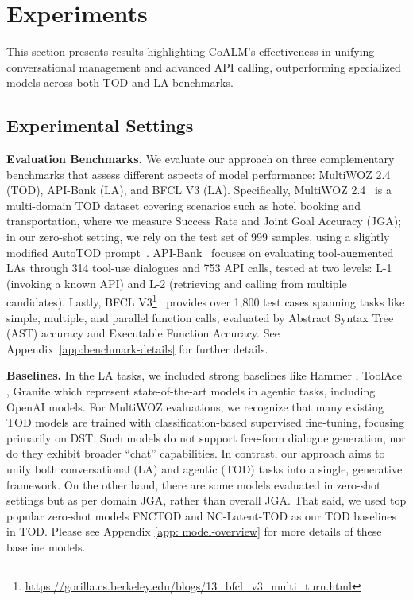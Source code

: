\section{Experiments}
This section presents results highlighting CoALM's effectiveness in unifying conversational management and advanced API calling, outperforming specialized models across both TOD and LA benchmarks.




\subsection{Experimental Settings}

\noindent\textbf{Evaluation Benchmarks.} We evaluate our approach on three complementary benchmarks that assess different aspects of model performance: MultiWOZ 2.4 (TOD), API-Bank (LA), and BFCL V3 (LA). Specifically, MultiWOZ 2.4~\cite{ye-etal-2022-multiwoz} is a multi-domain TOD dataset covering scenarios such as hotel booking and transportation, where we measure Success Rate and Joint Goal Accuracy (JGA); in our zero-shot setting, we rely on the test set of 999 samples, using a slightly modified AutoTOD prompt~\cite{xu-etal-2024-rethinking}. API-Bank~\cite{li-etal-2023-apibank} focuses on evaluating tool-augmented LAs through 314 tool-use dialogues and 753 API calls, tested at two levels: L-1 (invoking a known API) and L-2 (retrieving and calling from multiple candidates). Lastly, BFCL V3\footnote{\url{https://gorilla.cs.berkeley.edu/blogs/13_bfcl_v3_multi_turn.html}}~\cite{patil2023gorilla} provides over 1{,}800 test cases spanning tasks like simple, multiple, and parallel function calls, evaluated by Abstract Syntax Tree (AST) accuracy and Executable Function Accuracy. See Appendix~\ref{app:benchmark-details} for further details. %

\vspace{3mm}

\noindent\textbf{Baselines.} In the LA tasks, we included strong baselines like Hammer \cite{Lin2024Hammer}, ToolAce \cite{Liu2024ToolACE}, Granite \cite{abdelaziz-etal-2024-granite} which represent state-of-the-art models in agentic tasks, including OpenAI models. For MultiWOZ evaluations, we recognize that many existing TOD models are trained with classification-based supervised fine-tuning, focusing primarily on DST. Such models do not support free-form dialogue generation, nor do they exhibit broader “chat” capabilities. In contrast, our approach aims to unify both conversational (LA) and agentic (TOD) tasks into a single, generative framework. On the other hand, there are some models evaluated in zero-shot settings but as per domain JGA, rather than overall JGA. That said, we used top popular zero-shot models FNCTOD \cite{li2024largelanguagemodelszeroshot} and NC-Latent-TOD \cite{king-flanigan-2024-unsupervised} as our TOD baselines in TOD. Please see Appendix \ref{app: model-overview} for more details of these baseline models. 



